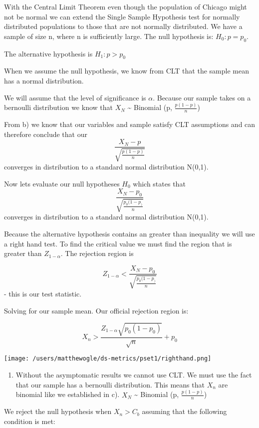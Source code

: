 \documentclass[
  12pt,
  landscape]{article}
\providecommand{\tightlist}{%
  \setlength{\itemsep}{0pt}\setlength{\parskip}{0pt}}
\begin{document}
With the Central Limit Theorem even though the population of Chicago
might not be normal we can extend the Single Sample Hypothesis test for
normally distributed populations to those that are not normally
distributed. We have a sample of size n, where n is sufficiently large.
The null hypothesis is: \(H_0: p = p_0\).

The alternative hypothesis is \(H_1: p > p_0\)

When we assume the null hypothesis, we know from CLT that the sample
mean has a normal distribution.

We will assume that the level of significance is \(\alpha\). Because our
sample takes on a bernoulli distribution we know that \(X_N\)
\textasciitilde{} Binomial (p, \(\frac{p(1-p)}n\))

From b) we know that our variables and sample satisfy CLT assumptions
and can therefore conclude that our
\[\frac{X_N-p}{\sqrt{\frac{p(1-p)}{n}}}\] converges in distribution to a
standard normal distribution N(0,1).

Now lets evaluate our null hypotheses \(H_0\) which states that
\[\frac{X_N-p_0}{\sqrt{\frac{p_0(1-p_)}{n}}}\] converges in distribution
to a standard normal distribution N(0,1).

Because the alternative hypothesis contains an greater than inequality
we will use a right hand test. To find the critical value we must find
the region that is greater than \(Z_{1-\alpha}\). The rejection region
is

\[
Z_{1-\alpha} < \frac{X_N-p_0}{\sqrt{\frac{p_0(1-p_)}{n}}}
\] - this is our test statistic.

Solving for our sample mean. Our official rejection region is:

\[
X_n > \frac{Z_{1-\alpha} \sqrt{p_0(1 - p_0)}} {\sqrt{n}} + p_0 
\]

\texttt{[image: /users/matthewogle/ds-metrics/pset1/righthand.png]}

\begin{enumerate}
\def\labelenumi{(\alph{enumi})}
\setcounter{enumi}{3}
\tightlist
\item
  Without the asymptomatic results we cannot use CLT. We must use the
  fact that our sample has a bernoulli distribution. This means that
  \({X_n}\) are binomial like we established in c). \(X_N\)
  \textasciitilde{} Binomial (p, \(\frac{p(1-p)}{n}\))
\end{enumerate}

We reject the null hypothesis when \(X_n > C_b\) assuming that the
following condition is met:
\end{document}
